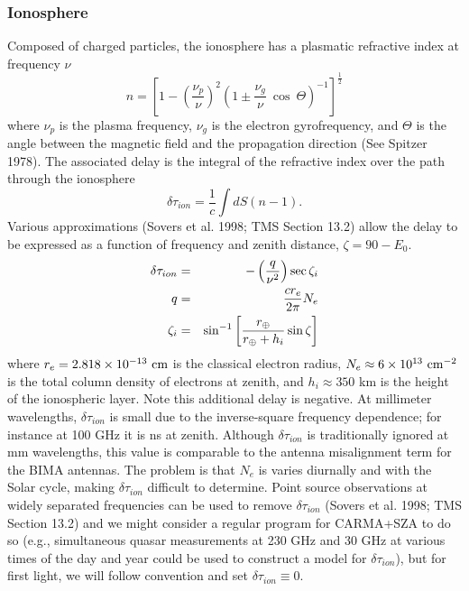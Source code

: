 \documentclass[preprint]{aastex}
\newcommand{\rearth}{  %
   \ifmmode{r_\oplus}
   \else{$r_\oplus$}
   \fi}
\def\nexpo#1#2{\ifmmode{#1 \times 10^{#2}}\else{$#1 \times 10^{#2}$}\fi}
\def\eg             {{\rm e.g.}\/}
\def\cmtwo {\ifmmode{{\rm cm^{-2}}}\else{{${\rm cm^{-2}}$}}\fi}
\begin{document}
\subsubsection{Ionosphere\label{s-ionosphere}}
Composed of charged particles, the ionosphere has a plasmatic 
refractive index at frequency $\nu$
\begin{equation}
n = {\left[ 1 - {\left( \frac{\nu_p}{\nu} \right)}^2
           {\left(1 \pm \frac{\nu_g}{\nu}~\cos~\Theta \right)}^{-1}
    \right]}^{\frac{1}{2}}
\end{equation}
\noindent where $\nu_p$ is the plasma frequency, $\nu_g$ is the
electron gyrofrequency, and $\Theta$ is the angle between the
magnetic field and the propagation direction (See Spitzer 1978).  
The associated delay
is the integral of the refractive index over the path through
the ionosphere
\begin{equation}
\delta\tau_{ion} = \frac{1}{c} \int dS (n - 1).
\end{equation}
\noindent Various approximations (Sovers et al. 1998; TMS Section 13.2)
allow the delay to be expressed as a function of frequency and 
zenith distance, $\zeta = 90 - E_0$. 
\begin{eqnarray}
\delta\tau_{ion} &=& -\left(\frac{q}{\nu^2}\right) \sec \zeta_i \\
           q &=& \frac{c r_e}{2 \pi} N_e\\
           \zeta_i &=& \sin^{-1} \left[ \frac{\rearth}{\rearth+h_i} \sin \zeta \right] 
\end{eqnarray}
\noindent where $r_e = \nexpo{2.818}{-13}~{\rm cm}$ is the classical electron 
radius, $N_e \approx \nexpo{6}{13}~\cmtwo$ is the total column
density of electrons at zenith, and $h_i \approx 350$ km is the height of the
ionospheric layer.  Note this additional delay is negative.
At millimeter wavelengths, $\delta\tau_{ion}$ is small due to the inverse-square
frequency dependence; for instance
at 100 GHz it is \nexpo{8}{-3} ns at zenith.  Although $\delta\tau_{ion}$ 
is traditionally ignored at mm wavelengths, this value is comparable to the
antenna misalignment term for the BIMA antennas.  The problem is that
$N_e$ is varies diurnally and with the Solar cycle, making $\delta\tau_{ion}$
difficult to determine.  Point source observations
at widely separated frequencies can be used to remove $\delta\tau_{ion}$
(Sovers et al. 1998; TMS Section 13.2) and we might consider a
regular program for CARMA+SZA to do so (\eg, simultaneous quasar measurements
at 230 GHz and 30 GHz at various times of the day and year could
be used to construct a model for $\delta\tau_{ion}$), but
for first light, we will follow convention and set $\delta\tau_{ion} \equiv 0$.
\end{document}
